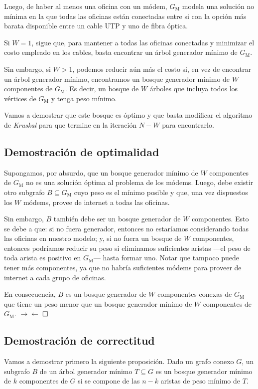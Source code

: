 Luego, de haber al menos una oficina con un módem, $G_{\text{M}}$  modela una solución no mínima en la que todas las oficinas están conectadas entre si con la opción más barata disponible entre un cable UTP y uno de fibra óptica. 

Si $W = 1$, sigue que, para mantener a todas las oficinas conectadas y minimizar el costo empleado en los cables, basta encontrar un árbol generador mínimo de $G_{\text{M}}$. 

Sin embargo, si $W > 1$, podemos reducir aún más el costo si, en vez de encontrar un árbol generador mínimo, encontramos un bosque generador mínimo de $W$ componentes de $G_{\text{M}}$. Es decir, un bosque de $W$ árboles que incluya todos los vértices de $G_{\text{M}}$ y tenga peso mínimo.

Vamos a demostrar que este bosque es óptimo y que basta modificar el algoritmo de \textit{Kruskal} para que termine en la iteración $N-W$ para encontrarlo.

\subsection{Demostración de optimalidad}

Supongamos, por absurdo, que un bosque generador mínimo de $W$ componentes de $G_{\text{M}}$ no es una solución óptima al problema de los módems. Luego, debe existir otro subgrafo $B \subseteq G_{\text{M}}$ cuyo peso es el mínimo posible y que, una vez dispuestos los $W$ módems, provee de internet a todas las oficinas. 

Sin embargo, $B$ también debe ser un bosque generador de $W$ componentes. Esto se debe a que: si no fuera generador, entonces no estaríamos considerando todas las oficinas en nuestro modelo; y, si no fuera un bosque de $W$ componentes, entonces podríamos reducir su peso si eliminamos suficientes aristas ---el peso de toda arista es positivo en $G_{\text{M}}$--- hasta formar uno. Notar que tampoco puede tener más componentes, ya que no habría suficientes módems para proveer de internet a cada grupo de oficinas. 

En consecuencia, $B$ es un bosque generador de $W$ componentes conexas de $G_{\text{M}}$ que tiene un peso menor que un bosque generador mínimo de $W$ componentes  de $G_{\text{M}}$. $\rightarrow\leftarrow$ $\hfill \square$

\subsection{Demostración de correctitud}\label{correctitud} Vamos a demostrar primero la siguiente proposición. Dado un grafo conexo $G$, un subgrafo $B$ de un árbol generador mínimo $T \subseteq G$ es un bosque generador mínimo de $k$ componentes de $G$ si se compone de las $n - k$ aristas de peso mínimo de $T$.

